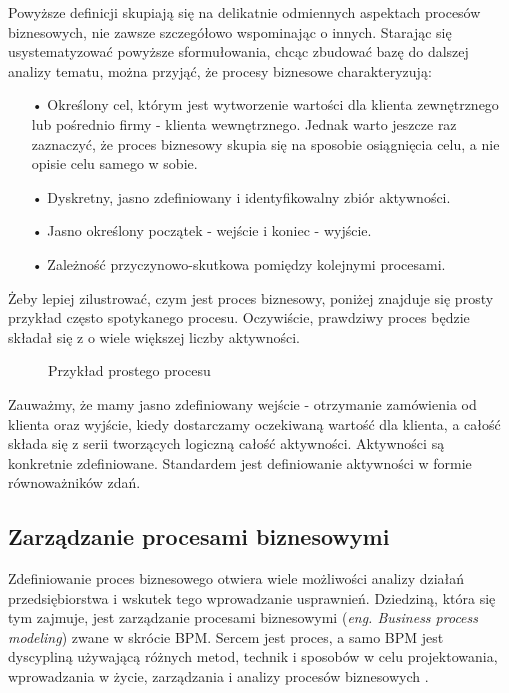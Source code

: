 Powyższe definicji skupiają się na delikatnie odmiennych aspektach procesów biznesowych, nie zawsze szczegółowo wspominając o innych. Starając się usystematyzować powyższe sformułowania, chcąc zbudować bazę do dalszej analizy tematu, można przyjąć, że procesy biznesowe charakteryzują:
\begin{itemize}
  \item[•] Określony cel, którym jest wytworzenie wartości dla klienta zewnętrznego lub pośrednio firmy - klienta wewnętrznego. Jednak warto jeszcze raz zaznaczyć, że proces biznesowy skupia się na sposobie osiągnięcia celu, a nie opisie celu samego w sobie. 
  \item[•] Dyskretny, jasno zdefiniowany i identyfikowalny zbiór aktywności. 
  \item[•] Jasno określony początek - wejście i koniec - wyjście.
  \item[•] Zależność przyczynowo-skutkowa pomiędzy kolejnymi procesami.
\end{itemize}

Żeby lepiej zilustrować, czym jest proces biznesowy, poniżej znajduje się prosty przykład często spotykanego procesu. Oczywiście, prawdziwy proces będzie składał się z o wiele większej liczby aktywności.

\begin{figure}[h]
	\caption{\label{fig:simple_business_process}Przykład prostego procesu}
\end{figure}

Zauważmy, że mamy jasno zdefiniowany wejście - otrzymanie zamówienia od klienta oraz wyjście, kiedy dostarczamy oczekiwaną wartość dla klienta, a całość składa się z serii tworzących logiczną całość aktywności. Aktywności są konkretnie zdefiniowane. Standardem jest definiowanie aktywności w formie równoważników zdań.


\subsection{Zarządzanie procesami biznesowymi}
Zdefiniowanie proces biznesowego otwiera wiele możliwości analizy działań przedsiębiorstwa i wskutek tego wprowadzanie usprawnień. Dziedziną, która się tym zajmuje, jest zarządzanie procesami biznesowymi (\textit{eng. Business process modeling}) zwane w skrócie BPM. Sercem jest proces, a samo BPM jest dyscypliną używającą różnych metod, technik i sposobów w celu projektowania, wprowadzania w życie, zarządzania i analizy procesów biznesowych \cite{BPMDemystified}. 

